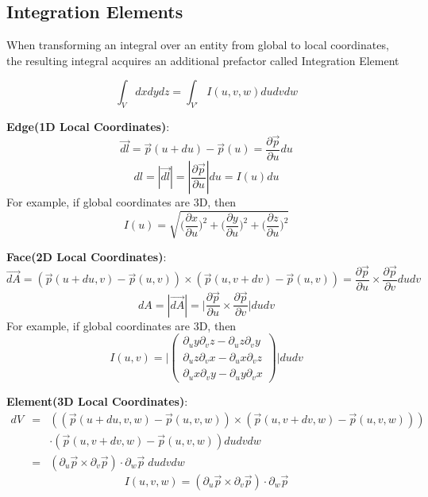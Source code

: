 \subsection{Integration Elements}
\label{appendix:integrationelements:proof}

When transforming an integral over an entity from global to local coordinates, the resulting integral acquires an additional prefactor called Integration Element

\[ \int_{V} dx dy dz = \int_{V'} I(u,v,w) du dv dw \]

\noindent
\textbf{Edge(1D Local Coordinates)}:
\[\vec{dl} = \vec{p}(u + du) - \vec{p}(u) = \frac{\partial \vec{p}}{\partial u} du \]
\[dl = |\vec{dl}| = |\frac{\partial \vec{p}}{\partial u}| du = I(u)du \]
For example, if global coordinates are 3D, then
\[I(u) = \sqrt{\bigl (\frac{\partial x}{\partial u})^2 + \bigl (\frac{\partial y}{\partial u})^2 + \bigl (\frac{\partial z}{\partial u})^2} \]

\noindent
\textbf{Face(2D Local Coordinates)}:
\[\vec{dA} = (\vec{p}(u + du, v) - \vec{p}(u, v)) \times (\vec{p}(u, v + dv) - \vec{p}(u, v)) = \frac{\partial \vec{p}}{\partial u} \times \frac{\partial \vec{p}}{\partial v} du dv \]
\[dA = |\vec{dA}| = \bigl | \frac{\partial \vec{p}}{\partial u} \times \frac{\partial \vec{p}}{\partial v} \bigr | du dv \]
For example, if global coordinates are 3D, then
\[I(u,v) = \biggl | \begin{pmatrix}
  \partial_u y \partial_v z - \partial_u z \partial_v y \\
  \partial_u z \partial_v x - \partial_u x \partial_v z \\
  \partial_u x \partial_v y - \partial_u y \partial_v x
\end{pmatrix} \biggr | du dv \]

\noindent
\textbf{Element(3D Local Coordinates)}:
\begin{eqnarray*}
  dV & = & ((\vec{p}(u + du, v, w) - \vec{p}(u, v, w)) \times (\vec{p}(u, v + dv, w) - \vec{p}(u, v, w))) \\
     && \cdot  (\vec{p}(u, v + dv, w) - \vec{p}(u, v, w)) du dv dw  \\
     & = & (\partial_u \vec{p} \times \partial_v \vec{p}) \cdot \partial_w \vec{p} \; du dv dw
\end{eqnarray*}
\[ I(u,v,w) = (\partial_u \vec{p} \times \partial_v \vec{p}) \cdot \partial_w \vec{p} \]

